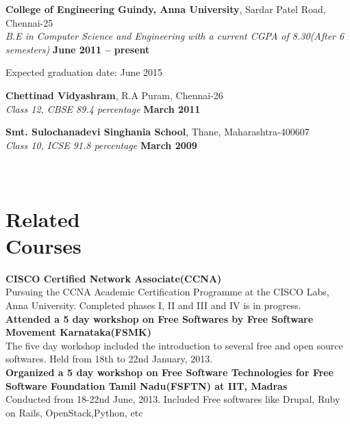 \documentclass[margin,line]{resume}
\begin{document}
\begin{resume}
    \textbf{College of Engineering Guindy, Anna University}, Sardar Patel Road, Chennai-25 \vspace{2mm}\\\vspace{1mm}%
    \textsl{B.E in Computer Science and Engineering with a current CGPA of 8.30(After 6 semesters)} \hfill \textbf{June 2011 -- present}\vspace{-3mm}\vspace{-1mm}%
        \item Expected graduation date: June 2015
    
    \textbf{Chettinad Vidyashram}, R.A Puram, Chennai-26 \vspace{2mm}\\\vspace{1mm}%
    \textsl{Class 12, CBSE 89.4 percentage} \hfill \textbf{March 2011}\vspace{-3mm}\vspace{-1mm}%

    \textbf{Smt. Sulochanadevi Singhania School}, Thane, Maharashtra-400607 \vspace{2mm}\\\vspace{1mm}%
    \textsl{Class 10, ICSE 91.8 percentage} \hfill \textbf{March 2009}\vspace{-3mm}\\\vspace{-1mm}%
    \\\\\section{\mysidestyle Related\\Courses} 
    \textbf{CISCO Certified Network Associate(CCNA)} \\Pursuing the CCNA Academic Certification Programme at the CISCO Labs, Anna University. Completed phases I, II and III and IV is in progress. \vspace{2mm}\\\vspace{1mm}%
    \textbf{Attended a 5 day workshop on Free Softwares by Free Software Movement Karnataka(FSMK)}\\The five day workshop included the introduction to several free and open source softwares. Held from 18th to 22nd January, 2013.  \vspace{2mm}\vspace{1mm}%
    \\\textbf{Organized a 5 day workshop on Free Software Technologies for Free Software Foundation Tamil Nadu(FSFTN) at IIT, Madras}\\Conducted from 18-22nd June, 2013. Included Free softwares like Drupal, Ruby on Rails, OpenStack,Python, etc  \vspace{2mm}\vspace{1mm}%


\end{resume}
\end{document}
